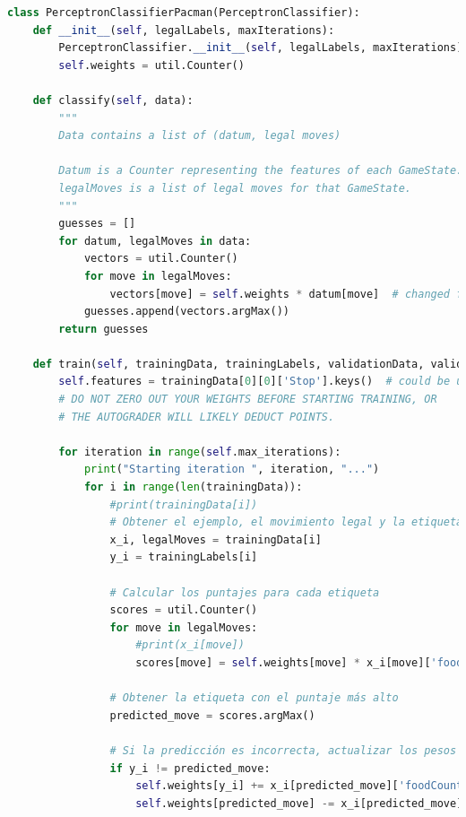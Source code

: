 \documentclass{report}
\begin{document}
        \begin{lstlisting}[language=Python, caption=Implementación inicial del clonador de comportamiento del pacman]
class PerceptronClassifierPacman(PerceptronClassifier):
    def __init__(self, legalLabels, maxIterations):
        PerceptronClassifier.__init__(self, legalLabels, maxIterations)
        self.weights = util.Counter()

    def classify(self, data):
        """
        Data contains a list of (datum, legal moves)
        
        Datum is a Counter representing the features of each GameState.
        legalMoves is a list of legal moves for that GameState.
        """
        guesses = []
        for datum, legalMoves in data:
            vectors = util.Counter()
            for move in legalMoves:
                vectors[move] = self.weights * datum[move]  # changed from datum to datum[l]
            guesses.append(vectors.argMax())
        return guesses

    def train(self, trainingData, trainingLabels, validationData, validationLabels):
        self.features = trainingData[0][0]['Stop'].keys()  # could be useful later
        # DO NOT ZERO OUT YOUR WEIGHTS BEFORE STARTING TRAINING, OR
        # THE AUTOGRADER WILL LIKELY DEDUCT POINTS.

        for iteration in range(self.max_iterations):
            print("Starting iteration ", iteration, "...")
            for i in range(len(trainingData)):
                #print(trainingData[i])
                # Obtener el ejemplo, el movimiento legal y la etiqueta
                x_i, legalMoves = trainingData[i]
                y_i = trainingLabels[i]
                
                # Calcular los puntajes para cada etiqueta
                scores = util.Counter()
                for move in legalMoves:
                    #print(x_i[move])
                    scores[move] = self.weights[move] * x_i[move]['foodCount']
                
                # Obtener la etiqueta con el puntaje más alto
                predicted_move = scores.argMax()
                
                # Si la predicción es incorrecta, actualizar los pesos
                if y_i != predicted_move:
                    self.weights[y_i] += x_i[predicted_move]['foodCount']
                    self.weights[predicted_move] -= x_i[predicted_move]['foodCount']
        \end{lstlisting}
        \vfill
\end{document}

